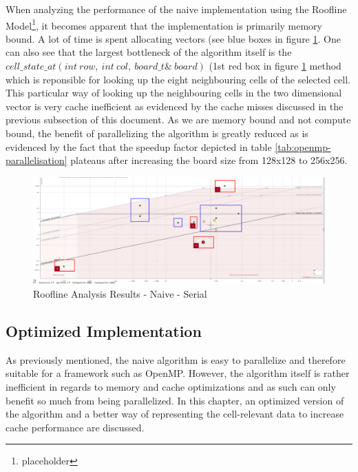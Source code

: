\documentclass[a4paper,german,12pt,twoside=false]{scrartcl} %
\begin{document}
When analyzing the performance of the naive implementation using the Roofline Model\footnote{placeholder}, it becomes apparent that the implementation is primarily memory bound. A lot of time is spent allocating vectors (see blue boxes in figure \ref{fig:roofline-naive-32-100k}. One can also see that the largest bottleneck of the algorithm itself is the \textbf{$cell{\_}state{\_}at(int{\ }row,{\ }int{\ }col,{\ }board{\_}t{\&}{\ } board)$} (1st red box in figure \ref{fig:roofline-naive-32-100k} method which is reponsible for looking up the eight neighbouring cells of the selected cell. This particular way of looking up the neighbouring cells in the two dimensional vector is very cache inefficient as evidenced by the cache misses discussed in the previous subsection of this document. As we are memory bound and not compute bound, the benefit of parallelizing the algorithm is greatly reduced as is evidenced by the fact that the speedup factor depicted in table \ref{tab:openmp-parallelisation} plateaus after increasing the board size from 128x128 to 256x256.

\begin{figure}[tbh!]
	\centering
	\includegraphics[width=16cm]{imgs/roofline-naive-32-100k.png}
	\caption{Roofline Analysis Results - Naive - Serial}
	\label{fig:roofline-naive-32-100k}
\end{figure}

\pagebreak

\subsection{Optimized Implementation}

As previously mentioned, the naive algorithm is easy to parallelize and therefore suitable for a framework such as OpenMP. However, the algorithm itself is rather inefficient in regards to memory and cache optimizations and as such can only benefit so much from being parallelized. In this chapter, an optimized version of the algorithm and a better way of representing the cell-relevant data to increase cache performance are discussed.
\end{document}
